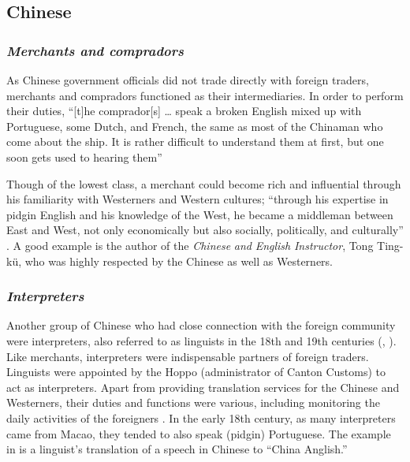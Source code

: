 \documentclass[output=paper]{langsci/langscibook}
\begin{document}
\subsection{Chinese}

\subsubsection{\textit{Merchants and compradors}}

As Chinese government officials did not trade directly with foreign traders, merchants and compradors functioned as their intermediaries. In order to perform their duties, “[t]he comprador[s] … speak a broken English mixed up with Portuguese, some Dutch, and French, the same as most of the Chinaman who come about the ship. It is rather difficult to understand them at first, but one soon gets used to hearing them”\citep[29]{tyng_before_1999}

Though of the lowest class, a merchant could become rich and influential through his familiarity with Westerners and Western cultures; “through his expertise in pidgin English and his knowledge of the West, he became a middleman between East and West, not only economically but also socially, politically, and culturally” \citep[180]{thao_du_1970}. A good example is the author of the \textit{Chinese} \textit{and} \textit{English} \textit{Instructor}, Tong Ting-kü, who was highly respected by the Chinese as well as Westerners.

\subsubsection{\textit{Interpreters}}

Another group of Chinese who had close connection with the foreign community were interpreters, also referred to as linguists in the 18th and 19th centuries (\citealt[50]{hunter_fan_1882}, \citealt{van_dyke_canton_2005}). Like merchants, interpreters were indispensable partners of foreign traders. Linguists were appointed by the Hoppo (administrator of Canton Customs) to act as interpreters. Apart from providing translation services for the Chinese and Westerners, their duties and functions were various, including monitoring the daily activities of the foreigners \citep{barreto_interpreters_2016}. In the early 18th century, as many interpreters came from Macao, they tended to also speak (pidgin) Portuguese. The example in  is a linguist’s translation of a speech in Chinese to “China Anglish.” 
\end{document}
